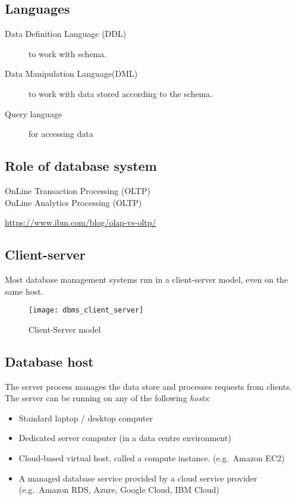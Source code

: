 \subsection{Languages}

\begin{description}
\item[Data Definition Language (DDL)] to work with schema.
\item[Data Manipulation Language(DML)] to work with data stored according to the schema.
\item[Query language] for accessing data
\end{description}


\subsection{Role of database system}

\begin{description}

\item[OnLine Transaction Processing (OLTP)]
 
\item[OnLine Analytics Processing (OLTP)]

\end{description}

\url{https://www.ibm.com/blog/olap-vs-oltp/}


\subsection{Client-server}\label{client-server}

Most database management systems run in a client-server model, even on the same host.

\begin{figure}[htbp]
  \centering
  \texttt{[image: dbms\_client\_server]}
  \caption{Client-Server model}
  \label{fig:client-server-model}
\end{figure}


\subsection{Database host}

The server process manages the data store and processes requests from
clients. The server can be running on any of the following \emph{hosts}:

\begin{itemize}
\item
  Standard laptop / desktop computer
\item
  Dedicated server computer (in a data centre environment)
\item
  Cloud-based virtual host, called a compute instance. (e.g.~Amazon EC2)
\item
  A managed database service provided by a cloud service provider
  (e.g.~Amazon RDS, Azure, Google Cloud, IBM Cloud)
\end{itemize}


